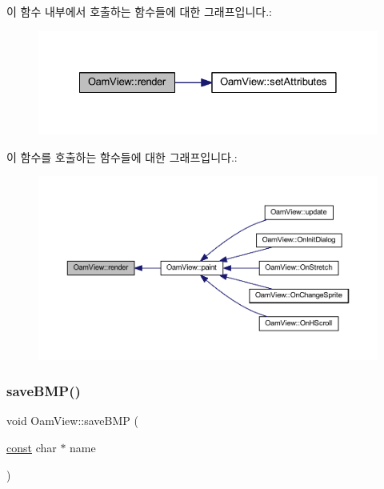 이 함수 내부에서 호출하는 함수들에 대한 그래프입니다.\+:
\nopagebreak
\begin{figure}[H]
\begin{center}
\leavevmode
\includegraphics[width=328pt]{class_oam_view_a391d8ee2931b2927e936c7100e676451_cgraph}
\end{center}
\end{figure}
이 함수를 호출하는 함수들에 대한 그래프입니다.\+:
\nopagebreak
\begin{figure}[H]
\begin{center}
\leavevmode
\includegraphics[width=350pt]{class_oam_view_a391d8ee2931b2927e936c7100e676451_icgraph}
\end{center}
\end{figure}
\mbox{\label{class_oam_view_aa760ae67c006a164258c21a127e1e847}} 
\subsubsection{\texorpdfstring{save\+B\+M\+P()}{saveBMP()}}
{\footnotesize\ttfamily void Oam\+View\+::save\+B\+MP (\begin{DoxyParamCaption}\item[{\mbox{\hyperlink{getopt1_8c_a2c212835823e3c54a8ab6d95c652660e}{const}} char $\ast$}]{name }\end{DoxyParamCaption})}



